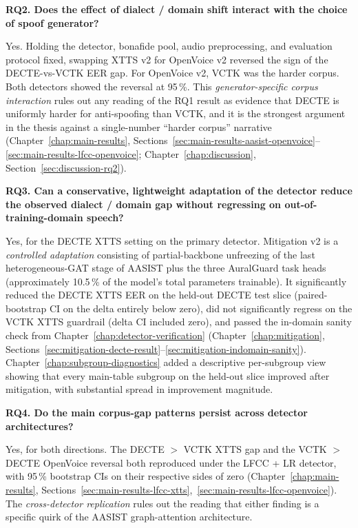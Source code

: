 \textbf{RQ2. Does the effect of dialect / domain shift interact with
the choice of spoof generator?}

Yes. Holding the detector, bonafide pool, audio preprocessing,
and evaluation protocol fixed, swapping XTTS v2 for OpenVoice v2
reversed the sign of the DECTE-vs-VCTK EER gap. For OpenVoice v2,
VCTK was the harder corpus. Both detectors showed the reversal at
95\,\%. This \emph{generator-specific corpus interaction} rules out any
reading of the RQ1 result as evidence that DECTE is uniformly
harder for anti-spoofing than VCTK, and it is the strongest
argument in the thesis against a single-number ``harder corpus''
narrative (Chapter~\ref{chap:main-results}, Sections~\ref{sec:main-results-aasist-openvoice}--\ref{sec:main-results-lfcc-openvoice}; Chapter~\ref{chap:discussion}, Section~\ref{sec:discussion-rq2}).

\textbf{RQ3. Can a conservative, lightweight adaptation of the
detector reduce the observed dialect / domain gap without
regressing on out-of-training-domain speech?}

Yes, for the DECTE XTTS setting on the primary detector.
Mitigation v2 is a \emph{controlled adaptation} consisting of
partial-backbone unfreezing of the last heterogeneous-GAT stage
of AASIST plus the three AuralGuard task heads (approximately
10.5\,\% of the model's total parameters trainable). It
significantly reduced the DECTE XTTS EER on the held-out DECTE
test slice (paired-bootstrap CI on the delta entirely below
zero), did not significantly regress on the VCTK XTTS guardrail
(delta CI included zero), and passed the in-domain sanity check
from Chapter~\ref{chap:detector-verification} (Chapter~\ref{chap:mitigation}, Sections~\ref{sec:mitigation-decte-result}--\ref{sec:mitigation-indomain-sanity}). Chapter~\ref{chap:subgroup-diagnostics} added a
descriptive per-subgroup view showing that every main-table
subgroup on the held-out slice improved after mitigation, with
substantial spread in improvement magnitude.

\textbf{RQ4. Do the main corpus-gap patterns persist across detector
architectures?}

Yes, for both directions. The DECTE $>$ VCTK XTTS gap and the
VCTK $>$ DECTE OpenVoice reversal both reproduced under the
LFCC + LR detector, with 95\,\% bootstrap CIs on their respective
sides of zero (Chapter~\ref{chap:main-results}, Sections~\ref{sec:main-results-lfcc-xtts},~\ref{sec:main-results-lfcc-openvoice}). The
\emph{cross-detector replication} rules out the reading that either
finding is a specific quirk of the AASIST graph-attention
architecture.


